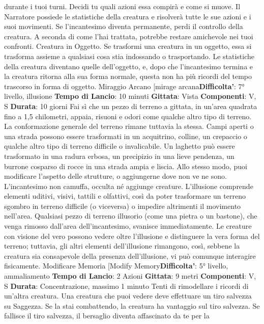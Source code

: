 \begin{multicols}{2}
durante i tuoi turni. Decidi tu quali azioni essa compirà e
come si muove. Il Narratore possiede le statistiche della
creatura e risolverà tutte le sue azioni e i suoi
movimenti.
Se l’incantesimo diventa permanente, perdi il controllo
della creatura. A seconda di come l’hai trattata,
potrebbe restare amichevole nei tuoi confronti.
Creatura in Oggetto. Se trasformi una creatura in un
oggetto, essa si trasforma assieme a qualsiasi cosa stia
indossando o trasportando. Le statistiche della creatura
diventano quelle dell’oggetto, e, dopo che l’incantesimo
termina e la creatura ritorna alla sua forma normale,
questa non ha più ricordi del tempo trascorso in forma
di oggetto.
Miraggio Arcano
[mirage arcana\textbf{Difficolta'}:
7° livello, illusione
\textbf{Tempo di Lancio}: 10 minuti
\textbf{Gittata}: Vista
\textbf{Componenti}: V, S
\textbf{Durata}: 10 giorni
Fai sì che un pezzo di terreno a gittata, in un’area
quadrata fino a 1,5 chilometri, appaia, risuoni e odori
come qualche altro tipo di terreno. La conformazione
generale del terreno rimane tuttavia la stessa. Campi
aperti o una strada possono essere trasformati in un
acquitrino, colline, un crepaccio o qualche altro tipo di
terreno difficile o invalicabile. Un laghetto può essere
trasformato in una radura erbosa, un precipizio in una
lieve pendenza, un burrone cosparso di rocce in una
strada ampia e liscia.
Allo stesso modo, puoi modificare l’aspetto delle
strutture, o aggiungerne dove non ve ne sono.
L’incantesimo non camuffa, occulta né aggiunge
creature.
L’illusione comprende elementi uditivi, visivi, tattili e
olfattivi, così da poter trasformare un terreno sgombro
in terreno difficile (o viceversa) o impedire altrimenti il
movimento nell’area. Qualsiasi pezzo di terreno illusorio
(come una pietra o un bastone), che venga rimosso
dall’area dell’incantesimo, svanisce immediatamente.
Le creature con visione del vero possono vedere oltre
l’illusione e distinguere la vera forma del terreno;
tuttavia, gli altri elementi dell’illusione rimangono, così,
sebbene la creatura sia consapevole della presenza
dell’illusione, vi può comunque interagire fisicamente.
Modificare Memoria
[Modify Memory\textbf{Difficolta'}:
5° livello, ammaliamento
\textbf{Tempo di Lancio}: 2 Azioni
\textbf{Gittata}: 9 metri
\textbf{Componenti}: V, S
\textbf{Durata}: Concentrazione, massimo 1 minuto
Tenti di rimodellare i ricordi di un’altra creatura. Una
creatura che puoi vedere deve effettuare un tiro
salvezza su Saggezza. Se la stai combattendo, la
creatura ha vantaggio sul tiro salvezza. Se fallisce il tiro
salvezza, il bersaglio diventa affascinato da te per la

\end{multicols}
